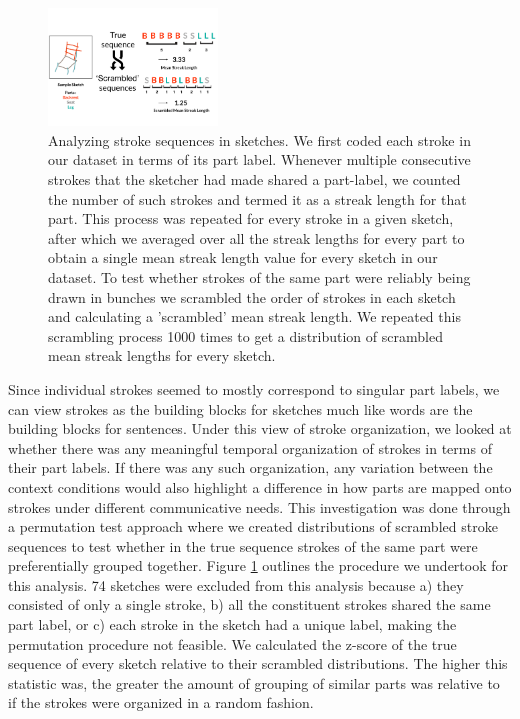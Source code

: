 \documentclass[10pt,letterpaper]{article}
\begin{document}
\begin{figure}
\centering
\includegraphics[width=0.4\textwidth]{figures/Part_sequence.png}
\caption{Analyzing stroke sequences in sketches. We first coded each stroke in our dataset in terms of its part label. Whenever multiple consecutive strokes that the sketcher had made shared a part-label, we counted the number of such strokes and termed it as a streak length for that part. This process was repeated for every stroke in a given sketch, after which we averaged over all the streak lengths for every part to obtain a single mean streak length value for every sketch in our dataset. To test whether strokes of the same part were reliably being drawn in bunches we scrambled the order of strokes in each sketch and calculating a 'scrambled' mean streak length. We repeated this scrambling process 1000 times to get a distribution of scrambled mean streak lengths for every sketch.}
\label{stroke_sequence_fig}
\end{figure}

Since individual strokes seemed to mostly correspond to singular part labels, we can view strokes as the building blocks for sketches much like words are the building blocks for sentences. Under this view of stroke organization, we looked at whether there was any meaningful temporal organization of strokes in terms of their part labels. If there was any such organization, any variation between the context conditions would also highlight a difference in how parts are mapped onto strokes under different communicative needs. This investigation was done through a permutation test approach where we created distributions of scrambled stroke sequences to test whether in the true sequence strokes of the same part were preferentially grouped together. Figure \ref{stroke_sequence_fig} outlines the procedure we undertook for this analysis.
74 sketches were excluded from this analysis because a) they consisted of only a single stroke, b) all the constituent strokes shared the same part label, or c) each stroke in the sketch had a unique label, making the permutation procedure not feasible.
We calculated the z-score of the true sequence of every sketch relative to their scrambled distributions. The higher this statistic was, the greater the amount of grouping of similar parts was relative to if the strokes were organized in a random fashion.
\end{document}
